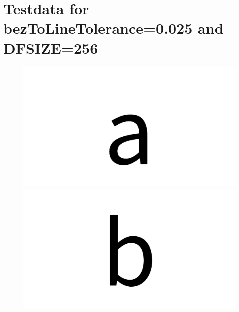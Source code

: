 \documentclass{article}
\begin{document}
\section{Testdata for bezToLineTolerance=0.025 and DFSIZE=256}
\begin{figure}[H]
  \includegraphics[width=\linewidth]{a}
\endminipage\hfill
{}
  \includegraphics[width=\linewidth]{b}
\endminipage\hfill
\end{figure}
\end{document}
